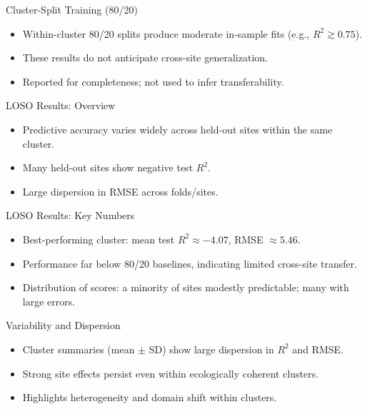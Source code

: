 \documentclass{beamer}
\begin{document}
\begin{frame}{Cluster-Split Training (80/20)}
  \begin{itemize}
    \item Within-cluster 80/20 splits produce moderate in-sample fits (e.g., \(R^2 \gtrsim 0.75\)).
    \item These results do not anticipate cross-site generalization.
    \item Reported for completeness; not used to infer transferability.
  \end{itemize}
\end{frame}

\begin{frame}{LOSO Results: Overview}
  \begin{itemize}
    \item Predictive accuracy varies widely across held-out sites within the same cluster.
    \item Many held-out sites show negative test \(R^2\).
    \item Large dispersion in RMSE across folds/sites.
  \end{itemize}
\end{frame}

\begin{frame}{LOSO Results: Key Numbers}
  \begin{itemize}
    \item Best-performing cluster: mean test \(R^2 \approx -4.07\), RMSE \(\approx 5.46\).
    \item Performance far below 80/20 baselines, indicating limited cross-site transfer.
    \item Distribution of scores: a minority of sites modestly predictable; many with large errors.
  \end{itemize}
\end{frame}

\begin{frame}{Variability and Dispersion}
  \begin{itemize}
    \item Cluster summaries (mean \(\pm\) SD) show large dispersion in \(R^2\) and RMSE.
    \item Strong site effects persist even within ecologically coherent clusters.
    \item Highlights heterogeneity and domain shift within clusters.
  \end{itemize}
\end{frame}
\end{document}
